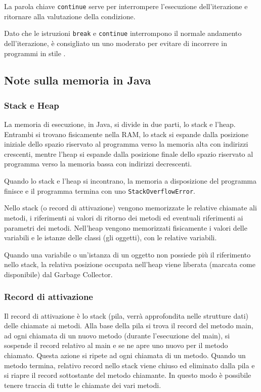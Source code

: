 \documentclass[a4paper]{article}
\begin{document}
La parola chiave \verb|continue| serve per interrompere l'esecuzione dell'iterazione e ritornare alla valutazione della condizione.

Dato che le istruzioni \verb|break| e \verb|continue| interrompono il normale andamento dell'iterazione, è consigliato un uno moderato
per evitare di incorrere in programmi in stile . 

\newpage


\subsection{Note sulla memoria in Java}
\subsubsection*{Stack e Heap}
La memoria di esecuzione, in Java, si divide in due parti, lo stack e l'heap. Entrambi si trovano fisicamente nella RAM, lo stack
si espande dalla posizione iniziale dello spazio riservato al programma verso la memoria alta con indirizzi crescenti, mentre l'heap
si espande dalla posizione finale dello spazio riservato al programma verso la memoria bassa con indirizzi decrescenti.

Quando lo stack e l'heap si incontrano, la memoria a disposizione del programma finisce e il programma termina con uno \verb|StackOverflowError|.

Nello stack (o record di attivazione) vengono memorizzate le relative chiamate ali metodi, i riferimenti ai valori di ritorno dei
metodi ed eventuali riferimenti ai parametri dei metodi. Nell'heap vengono memorizzati fisicamente i valori delle variabili e le
istanze delle classi (gli oggetti), con le relative variabili.

Quando una variabile o un'istanza di un oggetto non possiede più il riferimento nello stack, la relativa posizione occupata nell'heap
viene liberata (marcata come disponibile) dal Garbage Collector.

\subsubsection*{Record di attivazione}
Il record di attivazione è lo stack (pila, verrà approfondita nelle strutture dati) delle chiamate ai metodi.
Alla base della pila si trova il record del metodo main, ad ogni chiamata di un nuovo metodo (durante l'esecuzione del main),
si sospende il record relativo al main e se ne apre uno nuovo per il metodo chiamato. Questa azione si ripete ad ogni chiamata
di un metodo.
Quando un metodo termina, relativo record nello stack viene chiuso ed eliminato dalla pila e si riapre il record sottostante del
metodo chiamante.
In questo modo è possibile tenere traccia di tutte le chiamate dei vari metodi.
\end{document}
